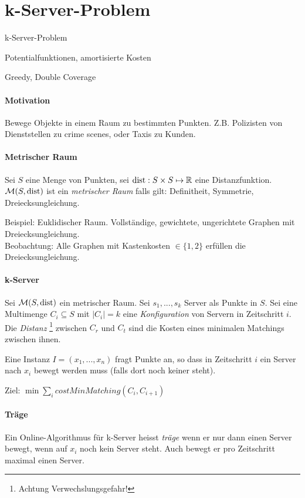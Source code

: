 \section{k-Server-Problem}

\begin{takeaway}
    \item k-Server-Problem
    \item Potentialfunktionen, amortisierte Kosten
    \item Greedy, Double Coverage
\end{takeaway}

\paragraph{Motivation}
Bewege Objekte in einem Raum zu bestimmten Punkten.
Z.B. Polizisten von Dienststellen zu crime scenes, oder Taxis zu Kunden.

\paragraph{Metrischer Raum}
Sei $S$ eine Menge von Punkten, sei $\text{dist} : S \times S \mapsto \mathbb{R}$ eine Distanzfunktion.
$\mathcal{M}(S, \text{dist})$ ist ein \emph{metrischer Raum} falls gilt:
Definitheit, Symmetrie, Dreiecksungleichung.

Beispiel: Euklidischer Raum. Vollständige, gewichtete, ungerichtete Graphen mit Dreiecksungleichung.
\\
Beobachtung: Alle Graphen mit Kastenkosten $\in \{1, 2\}$ erfüllen die Dreiecksungleichung.

\paragraph{k-Server}
Sei $\mathcal{M}(S, \text{dist})$ ein metrischer Raum.
Sei $s_1, ..., s_k$ Server als Punkte in $S$.
Sei eine Multimenge $C_i \subseteq S$ mit $|C_i|=k$ eine \emph{Konfiguration} von Servern in Zeitschritt $i$.
\\
Die \emph{Distanz} \footnote{Achtung Verwechslungsgefahr!}
zwischen $C_r$ und $C_t$ sind die Kosten eines minimalen Matchings zwischen ihnen.

Eine Instanz $I = (x_1, ..., x_n)$ fragt Punkte an, so dass in Zeitschritt $i$ ein Server nach $x_i$
bewegt werden muss (falls dort noch keiner steht).

Ziel: $\min \sum_i costMinMatching(C_i, C_{i+1})$

\paragraph{Träge}
Ein Online-Algorithmus für k-Server heisst \emph{träge} wenn er nur dann einen Server bewegt,
wenn auf $x_i$ noch kein Server steht.
Auch bewegt er pro Zeitschritt maximal einen Server.

